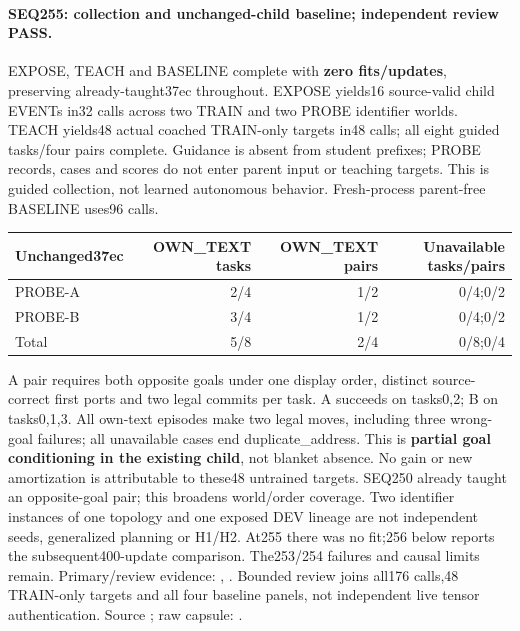 \documentclass[11pt]{article}
\begin{document}
\paragraph{SEQ255: collection and unchanged-child baseline; independent review PASS.}
EXPOSE, TEACH and BASELINE complete with \textbf{zero fits/updates}, preserving
already-taught37ec throughout. EXPOSE yields16 source-valid child EVENTs
in32 calls across two TRAIN and two PROBE identifier worlds. TEACH yields48
actual coached TRAIN-only targets in48 calls; all eight guided tasks/four pairs
complete. Guidance is absent from student prefixes; PROBE records, cases and
scores do not enter parent input or teaching targets. This is guided collection,
not learned autonomous behavior. Fresh-process parent-free BASELINE uses96 calls.
\begin{center}
\small
\begin{tabular}{lrrr}
\toprule
Unchanged37ec & OWN\_TEXT tasks & OWN\_TEXT pairs & Unavailable tasks/pairs \\
\midrule
PROBE-A & 2/4 & 1/2 & 0/4;0/2 \\
PROBE-B & 3/4 & 1/2 & 0/4;0/2 \\
Total & 5/8 & 2/4 & 0/8;0/4 \\
\bottomrule
\end{tabular}
\end{center}
A pair requires both opposite goals under one display order, distinct
source-correct first ports and two legal commits per task. A succeeds on tasks0,2;
B on tasks0,1,3. All own-text episodes make two legal moves, including three wrong-goal
failures; all unavailable cases end duplicate\_address. This is \textbf{partial
goal conditioning in the existing child}, not blanket absence. No gain or new
amortization is attributable to these48 untrained targets. SEQ250 already taught
an opposite-goal pair; this broadens world/order coverage. Two identifier
instances of one topology and one exposed DEV lineage are not independent
seeds, generalized planning or H1/H2. At255 there was no fit;256 below reports the subsequent400-update comparison.
The253/254 failures and causal limits remain.
Primary/review evidence:
,
.
Bounded review joins all176 calls,48 TRAIN-only targets and all four baseline
panels, not independent live tensor authentication. Source
; raw capsule:
.
\end{document}
